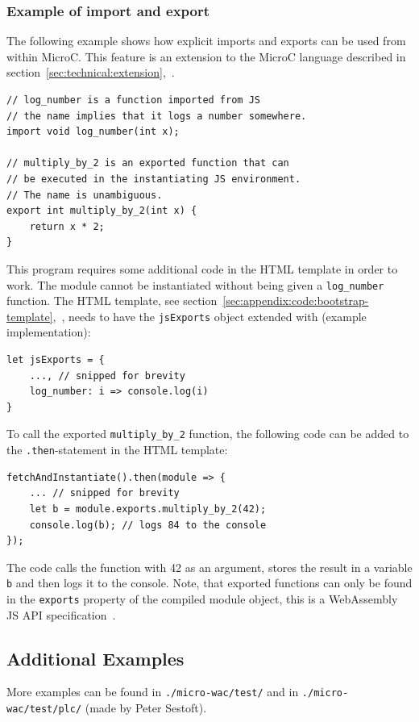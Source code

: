 \documentclass[a4paper]{article}
\begin{document}
\subsubsection{Example of import and export}
The following example shows how explicit imports and exports can be used from within MicroC. This feature is an extension to the MicroC language described in section~\ref{sec:technical:extension},~.

\begin{verbatim}
// log_number is a function imported from JS
// the name implies that it logs a number somewhere.
import void log_number(int x);

// multiply_by_2 is an exported function that can
// be executed in the instantiating JS environment.
// The name is unambiguous.
export int multiply_by_2(int x) {
	return x * 2;
}
\end{verbatim}

This program requires some additional code in the HTML template in order to work. The module cannot be instantiated without being given a \texttt{log\_number} function. The HTML template, see section~\ref{sec:appendix:code:bootstrap-template},~, needs to have the \texttt{jsExports} object extended with (example implementation):
\begin{verbatim}
let jsExports = {
	..., // snipped for brevity
	log_number: i => console.log(i)
}
\end{verbatim}

To call the exported \texttt{multiply\_by\_2} function, the following code can be added to the \texttt{.then}-statement in the HTML template:
\begin{verbatim}
fetchAndInstantiate().then(module => {
	... // snipped for brevity
	let b = module.exports.multiply_by_2(42);
	console.log(b); // logs 84 to the console
});
\end{verbatim}
The code calls the function with 42 as an argument, stores the result in a variable \texttt{b} and then logs it to the console. Note, that exported functions can only be found in the \texttt{exports} property of the compiled module object, this is a WebAssembly JS API specification~\cite{website:wasm-javascript-api}.

\subsection{Additional Examples}
More examples can be found in \texttt{./micro-wac/test/} and in \texttt{./micro-wac/test/plc/} (made by Peter Sestoft).
\end{document}
